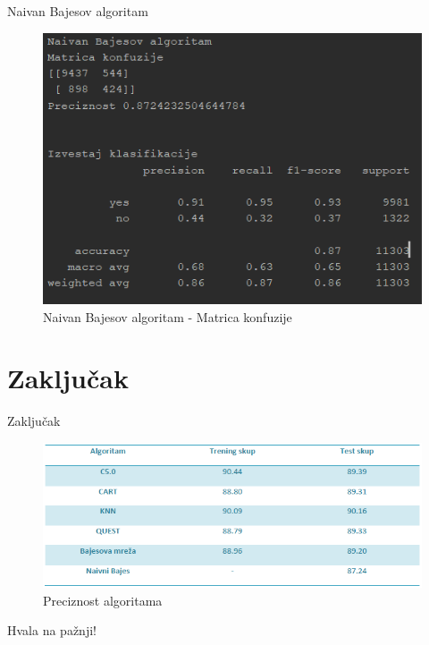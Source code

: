 \documentclass{beamer}
\begin{document}
\begin{frame}{Naivan Bajesov algoritam}
    \begin{figure}[h!]
                \begin{center}
                \includegraphics[scale=0.60]{naive_B_matrix.png}
                \end{center}
                \caption{Naivan Bajesov algoritam - Matrica konfuzije}
     \end{figure}
\end{frame}
\section{Zaključak}
\begin{frame}{Zaključak}
    \begin{figure}[h!]
                \begin{center}
                \includegraphics[scale=0.60]{zakljucak.png}
                \end{center}
                \caption{Preciznost algoritama}
      \end{figure}
\end{frame}


\begin{frame}{}
    \begin{center}
    Hvala na pažnji!
    \end{center}
\end{frame}
\end{document}
